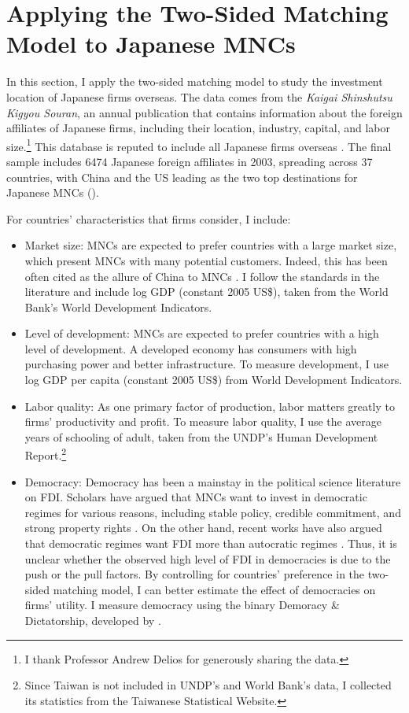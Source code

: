 \section{Applying the Two-Sided Matching Model to Japanese MNCs}
\label{sec:application}

In this section, I apply the two-sided matching model to study the investment location of Japanese firms overseas. The data comes from the \textit{Kaigai Shinshutsu Kigyou Souran}, an annual publication that contains information about the foreign affiliates of Japanese firms, including their location, industry, capital, and labor size.\footnote{I thank Professor Andrew Delios for generously sharing the data.} This database is reputed to include all Japanese firms overseas \citep{Yamawaki1991}. The final sample includes 6474 Japanese foreign affiliates in 2003, spreading across 37 countries, with China and the US leading as the two top destinations for Japanese MNCs ().

For countries' characteristics that firms consider, I include:

\begin{itemize}
\item Market size: MNCs are expected to prefer countries with a large market size, which present MNCs with many potential customers. Indeed, this has been often cited as the allure of China to MNCs \citep{Luo2010}. I follow the standards in the literature and include log GDP (constant 2005 US\$), taken from the World Bank's World Development Indicators.

\item Level of development: MNCs are expected to prefer countries with a high level of development. A developed economy has consumers with high purchasing power and better infrastructure. To measure development, I use log GDP per capita (constant 2005 US\$) from World Development Indicators.

\item Labor quality: As one primary factor of production, labor matters greatly to firms' productivity and profit. To measure labor quality, I use the average years of schooling of adult, taken from the UNDP's Human Development Report.\footnote{Since Taiwan is not included in UNDP's and World Bank's data, I collected its statistics from the Taiwanese Statistical Website.}

\item Democracy: Democracy has been a mainstay in the political science literature on FDI. Scholars have argued that MNCs want to invest in democratic regimes for various reasons, including stable policy, credible commitment, and strong property rights \citep{Ahlquist2006, Li2003, Jensen2003}. On the other hand, recent works have also argued that democratic regimes want FDI more than autocratic regimes \citep{Pandya2016}. Thus, it is unclear whether the observed high level of FDI in democracies is due to the push or the pull factors. By controlling for countries' preference in the two-sided matching model, I can better estimate the effect of democracies on firms' utility. I measure democracy using the binary Demoracy \& Dictatorship, developed by \citet{Cheibub2009b}.
\end{itemize}

